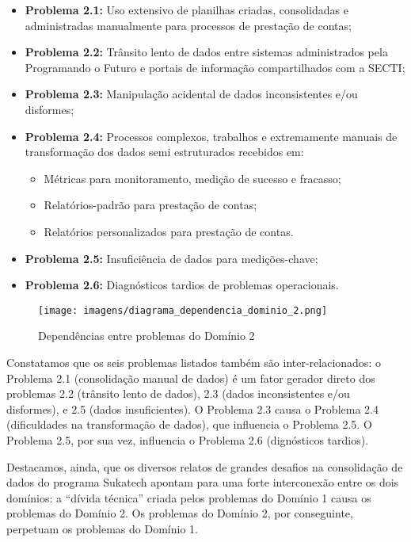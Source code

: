 \documentclass[
	12pt,				%
	openright,			%
	twoside,			%
	a4paper,			%
	english,			%
	french,				%
	spanish,			%
	brazil,				%
	]{abntex2}
\begin{document}
\begin{itemize}
  \item \textbf{Problema 2.1:} Uso extensivo de planilhas criadas, consolidadas e administradas manualmente para processos de prestação de contas;
  \item \textbf{Problema 2.2:} Trânsito lento de dados entre sistemas administrados pela Programando o Futuro e portais de informação compartilhados com a SECTI;
  \item \textbf{Problema 2.3:} Manipulação acidental de dados inconsistentes e/ou disformes;
  \item \textbf{Problema 2.4:} Processos complexos, trabalhos e extremamente manuais de transformação dos dados semi estruturados recebidos em:
  \begin{itemize}
    \item Métricas para monitoramento, medição de sucesso e fracasso;
    \item Relatórios-padrão para prestação de contas;
    \item Relatórios personalizados para prestação de contas.
  \end{itemize}
  \item \textbf{Problema 2.5:} Insuficiência de dados para medições-chave;
  \item \textbf{Problema 2.6:} Diagnósticos tardios de problemas operacionais.
\end{itemize}

\begin{figure}[ht]
	\caption{\label{rep_dependencia_dominio_2}Dependências entre problemas do Domínio 2}
	\begin{center}

  \texttt{[image: imagens/diagrama\_dependencia\_dominio\_2.png]}
	\end{center}
\end{figure}

Constatamos que os seis problemas listados também são inter-relacionados: o Problema 2.1 (consolidação manual de dados) é um fator gerador direto dos problemas 2.2 (trânsito lento de dados), 2.3 (dados inconsistentes e/ou disformes), e 2.5 (dados insuficientes). O Problema 2.3 causa o Problema 2.4 (dificuldades na transformação de dados), que influencia o Problema 2.5. O Problema 2.5, por sua vez, influencia o Problema 2.6 (dignósticos tardios).

Destacamos, ainda, que os diversos relatos de grandes desafios na consolidação de dados do programa Sukatech apontam para uma forte interconexão entre os dois domínios: a ``dívida técnica'' criada pelos problemas do Domínio 1 causa os problemas do Domínio 2. Os problemas do Domínio 2, por conseguinte, perpetuam os problemas do Domínio 1.
\end{document}
